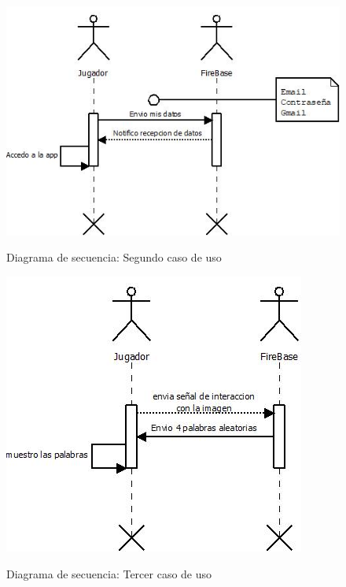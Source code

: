 \begin{figure}[htbp]
\centering
   \includegraphics[scale=0.9]{imgs/DS_2.jpeg}
   \begin{center}
   Diagrama de secuencia: Segundo caso de uso
   \end{center}
\end{figure}

\begin{figure}[htbp]
\centering
   \includegraphics[scale=0.9]{imgs/DS_3.jpeg}
   \begin{center}
   Diagrama de secuencia: Tercer caso de uso
   \end{center}
\end{figure}

